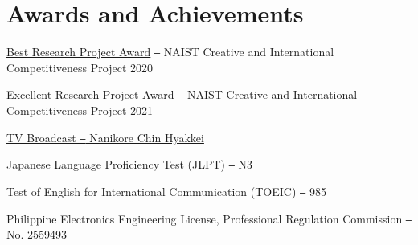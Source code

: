 \section{Awards and Achievements}
\cvSubHeadingListStart

\cvSubSubheading
{\href{https://sites.google.com/view/cicp2020-final-presentation}{Best Research Project Award} \texttt{--} NAIST Creative and International Competitiveness Project 2020}{}

\cvSubSubheading
{Excellent Research Project Award \texttt{--} NAIST Creative and International Competitiveness Project 2021}{}

\cvSubSubheading
{\href{https://imdl.naist.jp/blog_e/?p=2125}{TV Broadcast \texttt{--} Nanikore Chin Hyakkei}}{}

\cvSubSubheading
{Japanese Language Proficiency Test (JLPT) \texttt{--} N3}{}

\cvSubSubheading
{Test of English for International Communication (TOEIC) \texttt{--} 985}{}

\cvSubSubheading
{Philippine Electronics Engineering License, Professional Regulation Commission \texttt{--} No. 2559493}{}

\vspace{5pt}
\cvSubHeadingListEnd
